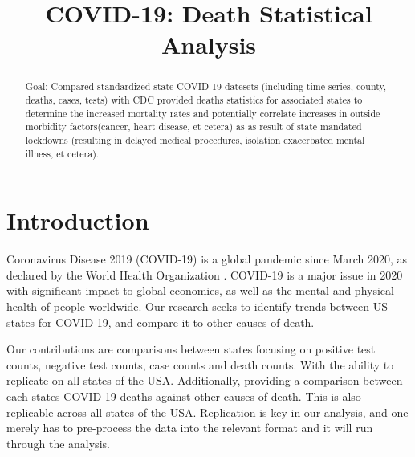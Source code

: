 \documentclass[conference]{IEEEtran}
\begin{document}
\title{COVID-19: Death Statistical Analysis}
\author{
\and
{}
\and
{}
}
\maketitle

\begin{abstract}
Goal: Compared standardized state COVID-19 datesets (including time series, county, deaths, cases, tests) with CDC provided deaths statistics for associated states to determine the increased mortality rates and potentially correlate increases in outside morbidity factors(cancer, heart disease, et cetera) as as result of state mandated lockdowns (resulting in delayed medical procedures, isolation exacerbated mental illness, et cetera).
\end{abstract}

\section{Introduction}

Coronavirus Disease 2019 (COVID-19) is a global pandemic since March 2020, as declared by the World Health Organization \cite{cucinotta_who_2020}.
COVID-19 is a major issue in 2020 with significant impact to global economies, as well as the mental and physical health of people worldwide.
Our research seeks to identify trends between US states for COVID-19, and compare it to other causes of death.

Our contributions are comparisons between states focusing on positive test counts, negative test counts, case counts and death counts. 
With the ability to replicate on all states of the USA. 
Additionally, providing a comparison between each states COVID-19 deaths against other causes of death.
This is also replicable across all states of the USA.
Replication is key in our analysis, and one merely has to pre-process the data into the relevant format and it will run through the analysis.
\end{document}
